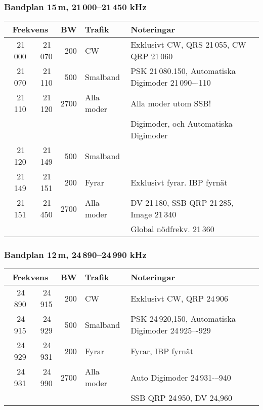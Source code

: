 \subsubsection{Bandplan 15\,m, 21\,000--21\,450 kHz}
\begin{tabular}{rrrll}
\multicolumn{2}{c}{\textbf{Frekvens}} & \textbf{BW} & \textbf{Trafik} & \textbf{Noteringar} \\ \hline

21\,000 & 21\,070 & 200  & CW         & Exklusivt CW, QRS 21\,055, CW QRP 21\,060           \\ \hline
21\,070 & 21\,110 & 500  & Smalband   & PSK 21\,080.150, Automatiska Digimoder 21\,090–-110 \\
21\,110 & 21\,120 & 2700 & Alla moder & Alla moder utom SSB!                                \\
        &         &      &            & Digimoder, och Automatiska Digimoder                \\ \hline
21\,120 & 21\,149 & 500  & Smalband   &                                                     \\ \hline
21\,149 & 21\,151 & 200  & Fyrar      & Exklusivt fyrar. IBP fyrnät                         \\ \hline
21\,151 & 21\,450 & 2700 & Alla moder & DV 21\,180, SSB QRP 21\,285, Image 21\,340          \\
        &         &      &            & Global nödfrekv. 21\,360                            \\ \hline
\end{tabular}

\subsubsection{Bandplan 12\,m, 24\,890--24\,990 kHz}
\begin{tabular}{rrrll}
\multicolumn{2}{c}{\textbf{Frekvens}} & \textbf{BW} & \textbf{Trafik} & \textbf{Noteringar} \\ \hline
24\,890 & 24\,915 & 200  & CW         & Exklusivt CW, QRP 24\,906                             \\ \hline
24\,915 & 24\,929 & 500  & Smalband   & PSK 24\,920,150, Automatiska Digimoder 24\,925–-929 \\ \hline
24\,929 & 24\,931 & 200  & Fyrar      & Fyrar, IBP fyrnät                                    \\ \hline
24\,931 & 24\,990 & 2700 & Alla moder & Auto Digimoder 24\,931-–940                        \\
       &        &      &            & SSB QRP 24\,950, DV 24,960                            \\ \hline
\end{tabular}


